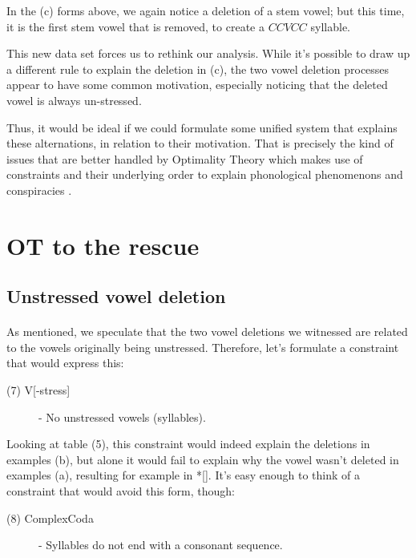 \documentclass[12pt,draft]{article}
\begin{document}
In the (c) forms above, we again notice a deletion of a stem vowel; but this time, it is the first stem vowel that is removed, to create a $CCVCC$ syllable.

This new data set forces us to rethink our analysis.
While it's possible to draw up a different rule to explain the deletion in (c), the two vowel deletion processes appear to have some common motivation, especially noticing that the deleted vowel is always un-stressed.

Thus, it would be ideal if we could formulate some unified system that explains these alternations, in relation to their motivation.
That is precisely the kind of issues that are better handled by Optimality Theory \cite{kager1999optimality} which makes use of constraints and their underlying order to explain phonological phenomenons and conspiracies \cite{kisseberth1970functional}.

\section {OT to the rescue}

\subsection {Unstressed vowel deletion}

\paragraph*{}
As mentioned, we speculate that the two vowel deletions we witnessed are related to the vowels originally being unstressed.
Therefore, let's formulate a constraint that would express this:

\begin{description}
	\item[(7) {\sc *V[-stress]}] - No unstressed vowels (syllables).
\end{description}

Looking at table (5), this constraint would indeed explain the deletions in examples (b), but alone it would fail to explain why the vowel wasn't deleted in examples (a), resulting for example in *[].
It's easy enough to think of a constraint that would avoid this form, though:

\begin{description}
	\item[(8) {\sc *ComplexCoda}] - Syllables do not end with a consonant sequence.
\end{description}
\end{document}
